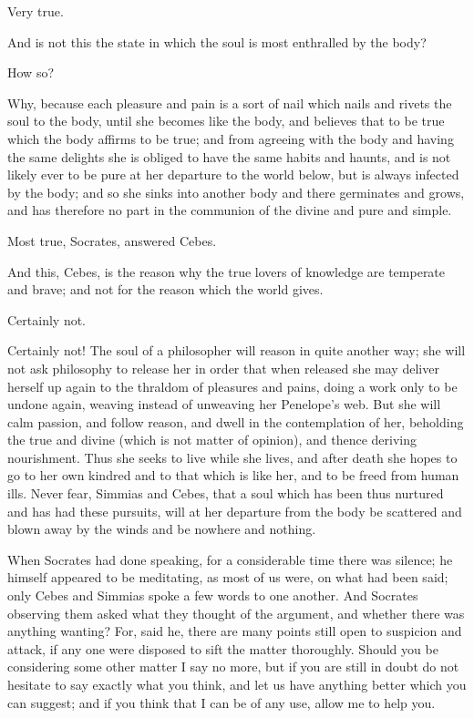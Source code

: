 \documentclass[11pt,letter]{article}
\begin{document}
\par  Very true.

\par  And is not this the state in which the soul is most enthralled by the body?

\par  How so?

\par  Why, because each pleasure and pain is a sort of nail which nails and rivets the soul to the body, until she becomes like the body, and believes that to be true which the body affirms to be true; and from agreeing with the body and having the same delights she is obliged to have the same habits and haunts, and is not likely ever to be pure at her departure to the world below, but is always infected by the body; and so she sinks into another body and there germinates and grows, and has therefore no part in the communion of the divine and pure and simple.

\par  Most true, Socrates, answered Cebes.

\par  And this, Cebes, is the reason why the true lovers of knowledge are temperate and brave; and not for the reason which the world gives.

\par  Certainly not.

\par  Certainly not! The soul of a philosopher will reason in quite another way; she will not ask philosophy to release her in order that when released she may deliver herself up again to the thraldom of pleasures and pains, doing a work only to be undone again, weaving instead of unweaving her Penelope's web. But she will calm passion, and follow reason, and dwell in the contemplation of her, beholding the true and divine (which is not matter of opinion), and thence deriving nourishment. Thus she seeks to live while she lives, and after death she hopes to go to her own kindred and to that which is like her, and to be freed from human ills. Never fear, Simmias and Cebes, that a soul which has been thus nurtured and has had these pursuits, will at her departure from the body be scattered and blown away by the winds and be nowhere and nothing.

\par  When Socrates had done speaking, for a considerable time there was silence; he himself appeared to be meditating, as most of us were, on what had been said; only Cebes and Simmias spoke a few words to one another. And Socrates observing them asked what they thought of the argument, and whether there was anything wanting? For, said he, there are many points still open to suspicion and attack, if any one were disposed to sift the matter thoroughly. Should you be considering some other matter I say no more, but if you are still in doubt do not hesitate to say exactly what you think, and let us have anything better which you can suggest; and if you think that I can be of any use, allow me to help you.
\end{document}
